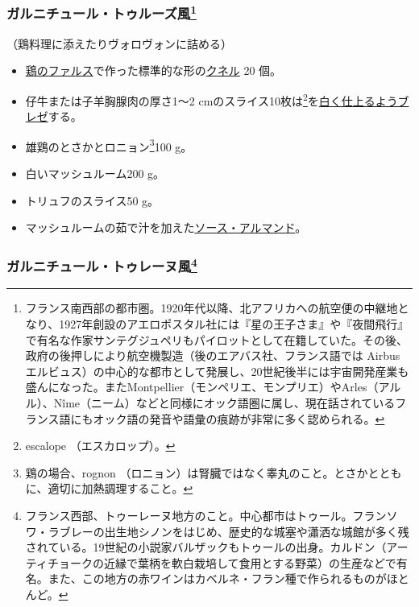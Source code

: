 \begin{recette}
{\subsubsection[ガルニチュール・トゥルーズ風]{\texorpdfstring{ガルニチュール・トゥルーズ風\footnote{フランス南西部の都市圏。1920年代以降、北アフリカへの航空便の中継地となり、1927年創設のアエロポスタル社には『星の王子さま』や『夜間飛行』で有名な作家サンテグジュペリもパイロットとして在籍していた。その後、政府の後押しにより航空機製造（後のエアバス社、フランス語では
  Airbus
  エルビュス）の中心的な都市として発展し、20世紀後半には宇宙開発産業も盛んになった。またMontpellier（モンペリエ、モンプリエ）やArles（アルル）、Nîme（ニーム）などと同様にオック語圏に属し、現在話されているフランス語にもオック語の発音や語彙の痕跡が非常に多く認められる。}}{ガルニチュール・トゥルーズ風}}\label{garniture-a-la-toulousaine}}



（鶏料理に添えたりヴォロヴォンに詰める）

\begin{itemize}
\item
  \protect\hyperlink{farce-a}{鶏のファルス}で作った標準的な形の\protect\hyperlink{quenelles-diverses}{クネル}
  20 個。
\item
  仔牛または子羊胸腺肉の厚さ1〜2 cmのスライス10枚は\footnote{escalope
    （エスカロップ）。}を\protect\hyperlink{les-braises-de-viandes-blanches}{白く仕上るようブレゼ}する。
\item
  雄鶏のとさかとロニョン\footnote{鶏の場合、rognon
    （ロニョン）は腎臓ではなく睾丸のこと。とさかとともに、適切に加熱調理すること。}100
  g。
\item
  白いマッシュルーム200 g。
\item
  トリュフのスライス50 g。
\item
  マッシュルームの茹で汁を加えた\protect\hyperlink{sauce-allemande}{ソース・アルマンド}。
\end{itemize}

\atoaki{}

\hypertarget{garniture-a-la-tourangelle}{%
\subsubsection[ガルニチュール・トゥレーヌ風]{\texorpdfstring{ガルニチュール・トゥレーヌ風\footnote{フランス西部、トゥーレーヌ地方のこと。中心都市はトゥール。フランソワ・ラブレーの出生地シノンをはじめ、歴史的な城塞や瀟洒な城館が多く残されている。19世紀の小説家バルザックもトゥールの出身。カルドン（アーティチョークの近縁で葉柄を軟白栽培して食用とする野菜）の生産などで有名。また、この地方の赤ワインはカベルネ・フラン種で作られるものがほとんど。}}{ガルニチュール・トゥレーヌ風}}\label{garniture-a-la-tourangelle}}


\end{recette}
